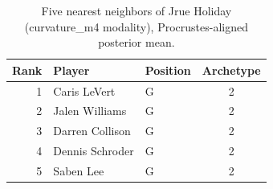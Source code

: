 \begin{table}[htbp]
  \centering\small
  \begin{tabular}{rllc}
    \toprule
    Rank & Player & Position & Archetype \\
    \midrule
    1 & Caris LeVert & G & 2 \\
    2 & Jalen Williams & G & 2 \\
    3 & Darren Collison & G & 2 \\
    4 & Dennis Schroder & G & 2 \\
    5 & Saben Lee & G & 2 \\
    \bottomrule
  \end{tabular}
  \caption{Five nearest neighbors of Jrue Holiday (curvature_m4 modality), Procrustes-aligned posterior mean.}
  \label{tab:Jrue_Holiday_neighbors_curvature_m4}
\end{table}

